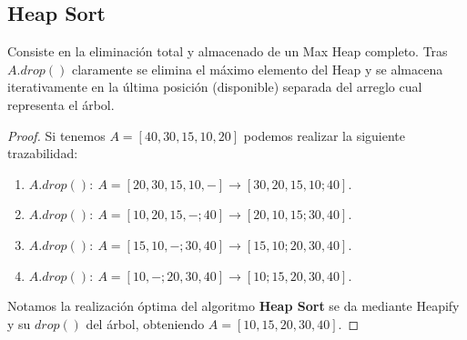 \documentclass[tikz,11pt,fleqn]{book} %
\begin{document}

\subsection{Heap Sort}
Consiste en la eliminación total y almacenado de un Max Heap completo. Tras $A.drop()$ claramente se elimina el máximo elemento del Heap y se almacena iterativamente en la última posición (disponible) separada del arreglo cual representa el árbol.
\begin{proof}
    Si tenemos $A=[40,30,15,10,20]$ podemos realizar la siguiente trazabilidad:
    \begin{enumerate}
        \item $A.drop():~A=[20,30,15,10,-]
            \to [30,20,15,10;40]$.
        \item $A.drop():~A=[10,20,15,-;40]
            \to [20,10,15;30,40]$.
        \item $A.drop():~A=[15,10,-;30,40]
            \to [15,10;20,30,40]$.
        \item $A.drop():~A=[10,-;20,30,40]
            \to [10;15,20,30,40]$.
    \end{enumerate}

    Notamos la realización óptima del algoritmo \textbf{Heap Sort} se da mediante Heapify y su $drop()$ del árbol, obteniendo $A=[10,15,20,30,40]$.
\end{proof}
\end{document}
